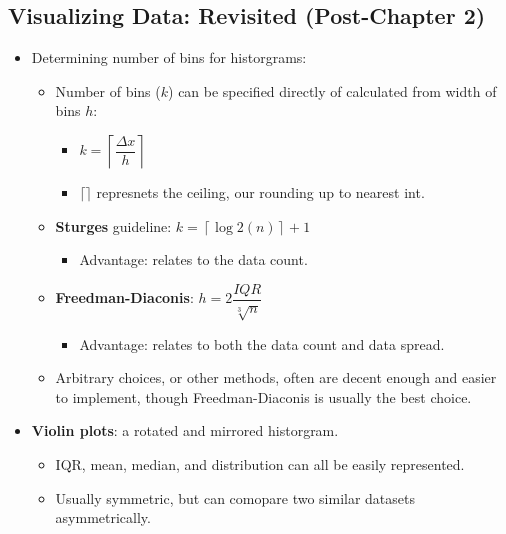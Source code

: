 \documentclass[12pt,a4paper]{article}
\begin{document}
\subsection{Visualizing Data: Revisited (Post-Chapter 2)}
\begin{itemize}
    \item Determining {\color{o-Sun}number of bins} for historgrams: 
        \begin{itemize}
            \item Number of bins (\(k\)) can be specified directly of calculated from width of bins \(h\):
                \begin{itemize}
                    \item \(k = \left\lceil \dfrac{\Delta x}{h} \right\rceil \)
                    \item \(\lceil \rceil \) represnets the ceiling, our rounding up to nearest int.
                \end{itemize}
            \item \textbf{Sturges} guideline: \(k=\left\lceil \log2(n)\right\rceil +1 \)
                \begin{itemize}
                    \item Advantage: relates to the data count.
                \end{itemize}
            \item \textbf{Freedman-Diaconis}: \(h = 2\dfrac{IQR}{\sqrt[3]{n}}\)
                \begin{itemize}
                    \item Advantage: relates to both the data count and data spread.
                \end{itemize}
            \item Arbitrary choices, or other methods, often are decent enough and easier to implement, though Freedman-Diaconis is usually the best choice.
        \end{itemize}
    \item \textbf{Violin plots}: a {\color{o-Sun}rotated} and {\color{o-Sun}mirrored} historgram. 
        \begin{itemize}
            \item IQR, mean, median, and distribution can all be easily represented.
            \item Usually symmetric, but can comopare two similar datasets asymmetrically.
        \end{itemize}
\end{itemize}
\end{document}
